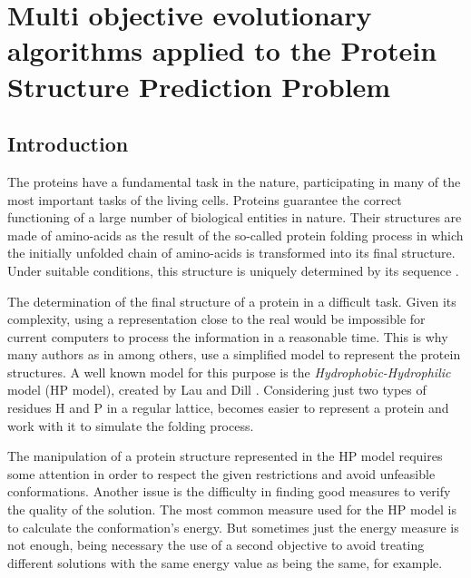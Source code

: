 

\chapter{Multi objective evolutionary algorithms applied to the Protein Structure Prediction Problem}


\section{Introduction} \label{sec:intro}


The proteins have a fundamental task in the nature, participating in many of the most important tasks of the living cells. Proteins guarantee the correct functioning of a large number of biological entities in nature. Their structures are made of amino-acids as the result of the so-called protein folding process in which the initially unfolded chain of amino-acids is transformed into its final structure. Under suitable conditions, this structure is uniquely determined by its sequence \cite{santana2004protein}.


The determination of the final structure of a protein in a difficult task. Given its complexity, using a representation close to the real would be impossible for current computers to process the information in a reasonable time. This is why many authors as in \cite{custodio2004investigation, hsu2003growth, krasnogor2002multimeme, lin2011protein, unger1993genetic} among others, use a simplified model to represent the protein structures. A well known model for this purpose is the \textit{Hydrophobic-Hydrophilic} model (HP model), created by Lau and Dill \cite{lau1989lattice}. Considering just two types of residues H and P in a regular lattice, becomes easier to represent a protein and work with it to simulate the folding process.


The manipulation of a protein structure represented in the HP model requires some attention in order to respect the given restrictions and avoid unfeasible conformations. Another issue is the difficulty in finding good measures to verify the quality of the solution. The most common measure used for the HP model is to calculate the conformation's energy. But sometimes just the energy measure is not enough, being necessary the use of a second objective to avoid treating different solutions with the same energy value as being the same, for example.



